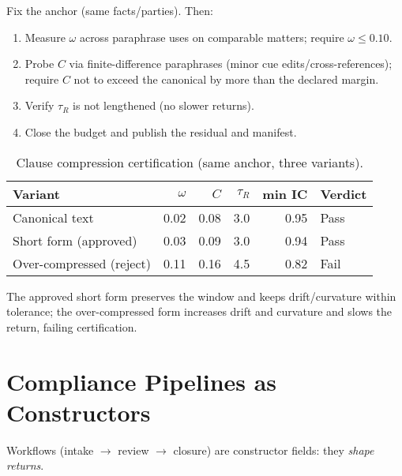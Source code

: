 \begin{eqbox}
Fix the anchor (same facts/parties). Then:
\begin{enumerate}[leftmargin=1.25em]
  \item Measure \(\omega\) across paraphrase uses on comparable matters; require \(\omega\le 0.10\).
  \item Probe \(C\) via finite-difference paraphrases (minor cue edits/cross-references); require \(C\) not to exceed the canonical by more than the declared margin.
  \item Verify \(\tau_R\) is not lengthened (no slower returns).
  \item Close the budget and publish the residual and manifest.
\end{enumerate}
\end{eqbox}

\begin{table}[h]
  \centering
  \caption{Clause compression certification (same anchor, three variants).}
  \label{tab:legal-compression}
  \begin{tabular}{@{} l r r r r l @{}}
    \toprule
    Variant & $\omega$ & $C$ & $\tau_{R}$ & min IC & Verdict \\
    \midrule
    Canonical text          & 0.02 & 0.08 & 3.0 & 0.95 & Pass \\
    Short form (approved)   & 0.03 & 0.09 & 3.0 & 0.94 & Pass \\
    Over-compressed (reject)& 0.11 & 0.16 & 4.5 & 0.82 & Fail \\
    \bottomrule
  \end{tabular}
\end{table}

\noindent The approved short form preserves the window and keeps drift/curvature within tolerance; the over-compressed form increases drift and curvature and slows the return, failing certification.

\section{Compliance Pipelines as Constructors}
\label{sec:legal-pipelines}

Workflows (intake \(\to\) review \(\to\) closure) are constructor fields: they \emph{shape returns}.

